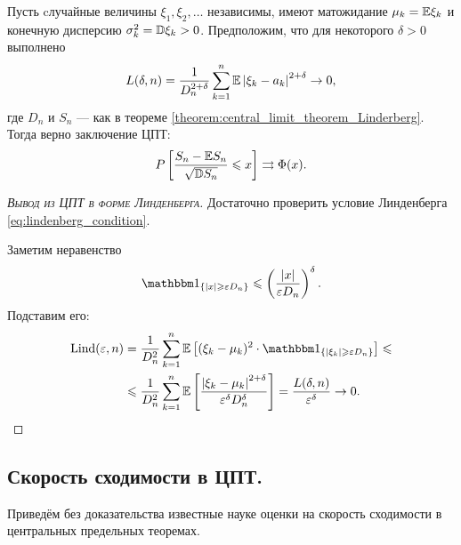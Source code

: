 \documentclass[../main.tex]{subfiles}
\begin{document}
\begin{thm}
 \label{theorem:central_limit_theorem_Lyapunov}
 Пусть cлучайные величины $ \xi_1, \xi_2, \ldots $ независимы, имеют матожидание $ \mu_k = \mathbb E \xi_k $ и конечную дисперсию $ \sigma_k^{2} = \mathbb D \xi_k > 0 $. Предположим, что для некоторого $ \delta > 0 $ выполнено
 \begin{align*}
  L(\delta, n) = \frac{1}{D_n^{2+\delta}} \sum_{k=1}^{n} \mathbb E \left| \xi_k - a_k \right|^{2 + \delta} \to 0,
 \end{align*} где $ D_n $ и $ S_n $ --- как в теореме \ref{theorem:central_limit_theorem_Linderberg}. Тогда верно заключение ЦПТ:
 \begin{align*}
  P \left[ \frac{S_n - \mathbb E S_n}{\sqrt{\mathbb D S_n}} \leqslant x \right] \rightrightarrows \Phi(x).
 \end{align*}
\end{thm}
\begin{proof}[\normalfont\textsc{Вывод из ЦПТ в форме Линденберга}]
 Достаточно проверить условие Линденберга \eqref{eq:lindenberg_condition}.

 Заметим неравенство
 \begin{align*}
  \Ind_{\left\{ \left| x \right| \geqslant \eps D_n \right\}} \leqslant \left( \frac{\left| x \right|}{\eps D_n} \right)^{\delta}.
 \end{align*} Подставим его:
 \begin{align*}
  \Lind(\eps,n) &= \frac{1}{D_n^{2}} \sum_{k=1}^{n}\E \left[ (\xi_k-\mu_k)^{2} \cdot \Ind_{\left\{ \left| \xi_k \right| \geqslant \eps D_n \right\}} \right] \leqslant\\
  &\leqslant \frac{1}{D_n^{2}} \sum_{k=1}^{n}\E \left[ \frac{\left| \xi_k-\mu_k \right|^{2 + \delta}}{\eps^{\delta} D_n^{\delta}} \right] = \frac{L(\delta,n)}{\eps^{\delta}} \to 0.
 \end{align*}
\end{proof}

\subsection{Скорость сходимости в ЦПТ.}

Приведём без доказательства известные науке оценки на скорость сходимости в центральных предельных теоремах.
\end{document}
